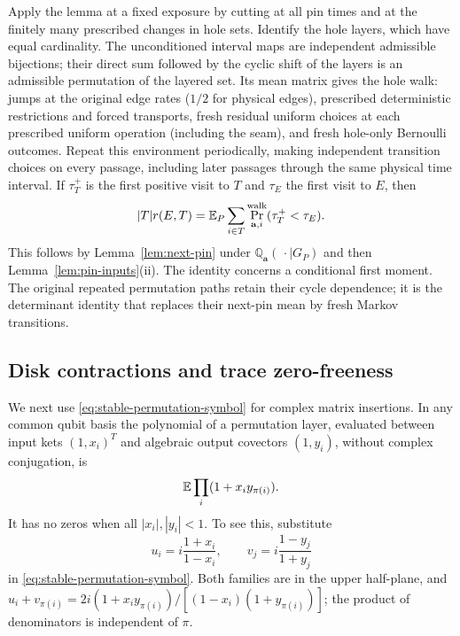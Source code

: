 Apply the lemma at a fixed exposure by cutting at all pin times and
at the finitely many prescribed changes in hole sets.  Identify the
hole layers, which have equal cardinality.  The unconditioned interval
maps are independent admissible bijections; their direct sum followed
by the cyclic shift of the layers is an admissible permutation of the
layered set.  Its mean matrix gives the hole walk: jumps at the original
edge rates ($1/2$ for physical edges), prescribed deterministic restrictions
and forced transports, fresh residual uniform choices at each prescribed
uniform operation (including the seam), and fresh hole-only Bernoulli
outcomes.  Repeat this environment periodically, making independent
transition choices on every passage, including later passages through
the same physical time interval.  If $\tau_T^+$ is the first positive
visit to $T$ and $\tau_E$ the first visit to $E$, then
\begin{equation}\label{eq:fresh-return-identity}
 |T|r(E,T)=\mathbb E_P\sum_{i\in T}
              \Pr^{\rm walk}_{\mathbf a,i}(\tau_T^+<\tau_E).
\end{equation}
This follows by Lemma~\ref{lem:next-pin} under
$\mathbb Q_{\mathbf a}(\,\cdot\mid G_P)$ and then
Lemma~\ref{lem:pin-inputs}(ii).  The identity concerns a conditional
first moment.  The original repeated permutation paths retain their
cycle dependence; it is the determinant identity that replaces their
next-pin mean by fresh Markov transitions.

\subsection{Disk contractions and trace zero-freeness}

We next use \eqref{eq:stable-permutation-symbol} for complex matrix
insertions.  In any common qubit basis the polynomial of a permutation
layer, evaluated between input kets $(1,x_i)^T$ and algebraic output
covectors $(1,y_i)$, without complex conjugation, is
\begin{equation}\label{eq:disk-symbol}
       \mathbb E\prod_i(1+x_i y_{\pi(i)}).
\end{equation}
It has no zeros when all $|x_i|,|y_i|<1$.  To see this, substitute
\[
       u_i=i\frac{1+x_i}{1-x_i},\qquad
       v_j=i\frac{1-y_j}{1+y_j}
\]
in \eqref{eq:stable-permutation-symbol}.  Both families are in the
upper half-plane, and
$u_i+v_{\pi(i)}=2i(1+x_i y_{\pi(i)})/
[(1-x_i)(1+y_{\pi(i)})]$; the product of denominators is independent
of $\pi$.

